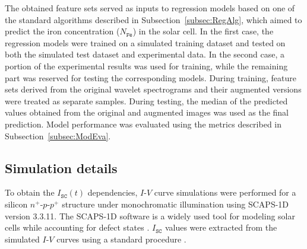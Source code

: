 \documentclass[10pt]{iopart}
\begin{document}
The obtained feature sets served as inputs to regression models based on one of the standard algorithms described in Subsection~\ref{subsec:RegAlg},
which aimed to predict the iron concentration ($N_\mathtt{Fe}$) in the solar cell.
In the first case, the regression models were trained on a simulated training dataset and tested on both the simulated test dataset and experimental data.
In the second case, a portion of the experimental results was used for training, while the remaining part was reserved for testing the corresponding models.
During training, feature sets derived from the original wavelet spectrograms and their augmented versions were treated as separate samples.
During testing, the median of the predicted values obtained from the original and augmented images was used as the final prediction.
Model performance was evaluated using the metrics described in Subsection~\ref{subsec:ModEva}.


\subsection{Simulation details}\label{subsec:SimDet}

To obtain the $I_\mathtt{SC}(t)$ dependencies, $I$-$V$ curve simulations were performed for a silicon $n^+$-$p$-$p^+$ structure
under monochromatic illumination using SCAPS-1D version 3.3.11.
The SCAPS-1D software \cite{SCAPS1} is a widely used tool for modeling solar cells
while accounting for defect states \cite{MasumMia2025, Joshi2024, Ravidas2024, Liu2024, You2023, SCAPSDefect3}.
$I_\mathtt{SC}$ values were extracted from the simulated $I$-$V$ curves using a standard procedure \cite{SCparam2017}.
\end{document}
